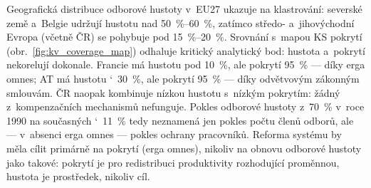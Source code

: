 Geografická distribuce odborové hustoty v~EU27 ukazuje na klastrování: severské země a~Belgie udržují hustotu nad \SIrange{50}{60}{\percent}, zatímco středo- a~jihovýchodní Evropa (včetně ČR) se pohybuje pod \SIrange{15}{20}{\percent}.
Srovnání s~mapou \ac{KS} pokrytí (obr.~\ref{fig:kv_coverage_map}) odhaluje kritický analytický bod: hustota a~pokrytí nekorelují dokonale.
Francie má hustotu pod \SI{10}{\percent}, ale pokrytí \SI{95}{\percent} --- díky erga omnes; AT má hustotu \char`~30~\%, ale pokrytí \SI{95}{\percent} --- díky odvětvovým zákonným smlouvám.
ČR naopak kombinuje nízkou hustotu s~nízkým pokrytím: žádný z~kompenzačních mechanismů nefunguje.
Pokles odborové hustoty z~\SI{70}{\percent} v~roce 1990 na současných \char`~11~\% tedy neznamená jen pokles počtu členů odborů, ale --- v~absenci erga omnes --- pokles ochrany pracovníků.
Reforma systému by měla cílit primárně na pokrytí (erga omnes), nikoliv na obnovu odborové hustoty jako takové: pokrytí je pro redistribuci produktivity rozhodující proměnnou, hustota je prostředek, nikoliv cíl.


